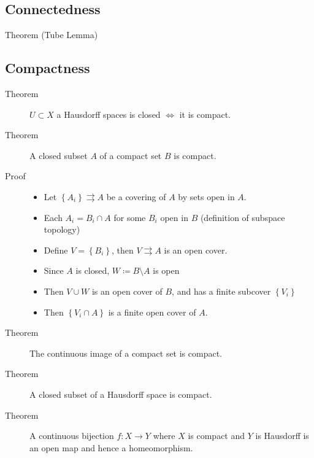 \hypertarget{connectedness-1}{%
\subsection{Connectedness}\label{connectedness-1}}

\begin{description}
\item[Theorem (Tube Lemma)]
\end{description}

\hypertarget{compactness-1}{%
\subsection{Compactness}\label{compactness-1}}

\begin{description}
\item[Theorem]
\(U\subset X\) a Hausdorff spaces is closed \(\iff\) it is compact.
\item[Theorem]
A closed subset \(A\) of a compact set \(B\) is compact.
\item[Proof]
\hfill

\begin{itemize}
\tightlist
\item
  Let \(\left\{{A_i}\right\} \rightrightarrows A\) be a covering of
  \(A\) by sets open in \(A\).
\item
  Each \(A_i = B_i \cap A\) for some \(B_i\) open in \(B\) (definition
  of subspace topology)
\item
  Define \(V = \left\{{B_i}\right\}\), then \(V \rightrightarrows A\) is
  an open cover.
\item
  Since \(A\) is closed, \(W\coloneqq B\setminus A\) is open
\item
  Then \(V\cup W\) is an open cover of \(B\), and has a finite subcover
  \(\left\{{V_i}\right\}\)
\item
  Then \(\left\{{V_i \cap A}\right\}\) is a finite open cover of \(A\).
\end{itemize}
\item[Theorem]
The continuous image of a compact set is compact.
\item[Theorem]
A closed subset of a Hausdorff space is compact.
\item[Theorem]
A continuous bijection \(f: X\to Y\) where \(X\) is compact and \(Y\) is
Hausdorff is an open map and hence a homeomorphism.
\end{description}


